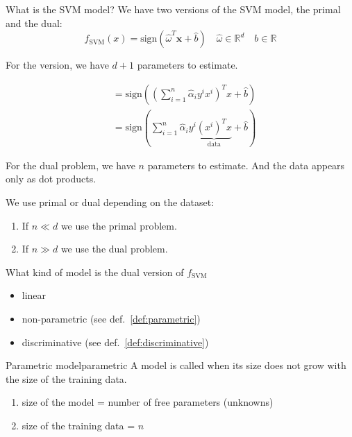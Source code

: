 \begin{question}{What is the SVM model?}{}
	We have two versions of the SVM model, the primal and the dual:
	\begin{equation*}
		f_\text{SVM}(x) = \text{sign} \left( \hat{\omega}^T \boldsymbol{x} + \hat{b} \right)
		\quad \hat\omega \in \mathds{R}^d
		\quad b \in \mathds{R}
		\tag{PRIMAL}
	\end{equation*}

	For the  version, we have $d+1$ parameters to estimate.

	\begin{align*}
		 & = \text{sign} \left( \left(\sum_{i=1}^n \hat\alpha_i y^i x^i \right)^T x + \hat{b} \right) \\
		 & = \text{sign} \left( \sum_{i=1}^n \hat\alpha_i y^i
		\underbrace{(x^i)^T x}_{\text{data}} + \hat{b} \right)
		\tag{DUAL}
	\end{align*}

	For the dual problem, we have $n$ parameters to estimate.
	And the data appears only as dot products.

	\vspace{0.5em}
	We use primal or dual depending on the dataset:
	\begin{enumerate}
		\item If $n \ll d$ we use the primal problem.
		\item If $n \gg d$ we use the dual problem.
	\end{enumerate}
\end{question}

\begin{question}{What kind of model is the dual version of $f_\text{SVM}$}{}
	\begin{itemize}
		\item linear
		\item non-parametric (see def.~\ref{def:parametric})
		\item discriminative (see def.~\ref{def:discriminative})
	\end{itemize}
\end{question}

\begin{definition}{Parametric model}{parametric}
	A model is called  when its size does not
	grow with the size of the training data.

	\begin{enumerate}
		\item size of the model = number of free parameters (unknowns)
		\item size of the training data = $n$
	\end{enumerate}
\end{definition}

